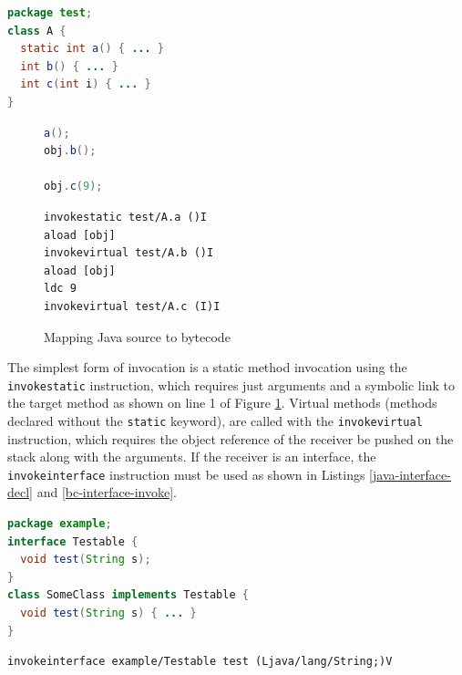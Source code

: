 \begin{lstlisting}[language=Java,caption=Java class methods,label=method-java]
package test;
class A {
  static int a() { ... }
  int b() { ... }
  int c(int i) { ... }
}
\end{lstlisting}

\begin{figure}[htbp]

\begin{minipage}[t]{0.45\textwidth}
\begin{lstlisting}[language=Java,frame=tlrb]
a();
obj.b();

obj.c(9);
\end{lstlisting}
\end{minipage}
\hspace{0.5cm}
\begin{minipage}[t]{0.45\textwidth}
\begin{lstlisting}[language=jvm-bytecode,frame=tlrb]
invokestatic test/A.a ()I
aload [obj]
invokevirtual test/A.b ()I
aload [obj]
ldc 9
invokevirtual test/A.c (I)I
\end{lstlisting}
\end{minipage}

\caption[Invocation Bytecode]{Mapping Java source to bytecode}
\label{fig:invoke-src-to-bc}
\end{figure}

The simplest form of invocation is a static method invocation using the \texttt{invokestatic} instruction, which requires just arguments and a symbolic link to the target method as shown on line 1 of Figure \ref{fig:invoke-src-to-bc}.  Virtual methods (methods declared without the \texttt{static} keyword), are called with the \texttt{invokevirtual} instruction, which requires the object reference of the receiver be pushed on the stack along with the arguments.  If the receiver is an interface, the \texttt{invokeinterface} instruction must be used as shown in Listings \ref{java-interface-decl} and \ref{bc-interface-invoke}.

\begin{lstlisting}[language=Java,caption=Java interface declaration,label=java-interface-decl]
package example;
interface Testable {
  void test(String s);
}
class SomeClass implements Testable {
  void test(String s) { ... }
}
\end{lstlisting}
\vspace{2em}
\begin{lstlisting}[language=jvm-bytecode,caption=Java interface invocation,label=bc-interface-invoke]
invokeinterface example/Testable test (Ljava/lang/String;)V
\end{lstlisting}

